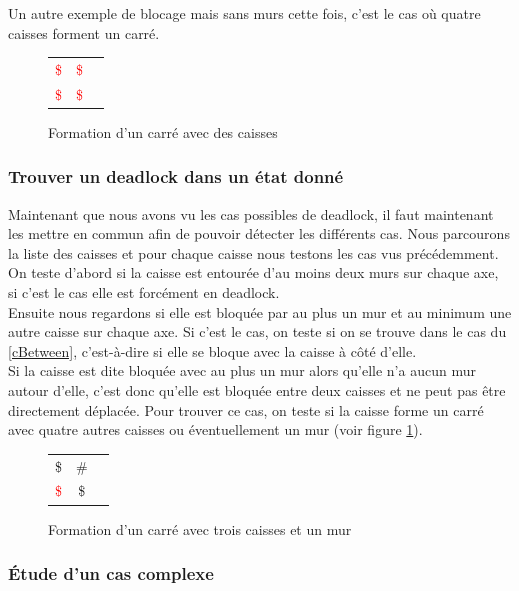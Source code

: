 \documentclass[a4paper,12pt]{article} %
\begin{document}
Un autre exemple de blocage mais sans murs cette fois, c'est le cas où quatre caisses forment un carré.

\begin{figure}[!h]
\centering
\begin{tabular}{ l c r }
\textcolor{red}{\$} & \textcolor{red}{\$} \\
\textcolor{red}{\$} & \textcolor{red}{\$} \\
\end{tabular}
\caption{Formation d'un carré avec des caisses}
\end{figure}

\subsubsection{Trouver un deadlock dans un état donné}

Maintenant que nous avons vu les cas possibles de deadlock, il faut maintenant les mettre en commun afin de pouvoir détecter les différents cas. Nous parcourons la liste des caisses et pour chaque caisse nous testons les cas vus précédemment. On teste d'abord si la caisse est entourée d'au moins deux murs sur chaque axe, si c'est le cas elle est forcément en deadlock.\\
Ensuite nous regardons si elle est bloquée par au plus un mur et au minimum une autre caisse sur chaque axe. Si c'est le cas, on teste si on se trouve dans le cas du \ref{cBetween}, c'est-à-dire si elle se bloque avec la caisse à côté d'elle.\\
Si la caisse est dite bloquée avec au plus un mur alors qu'elle n'a aucun mur autour d'elle, c'est donc qu'elle est bloquée entre deux caisses et ne peut pas être directement déplacée. Pour trouver ce cas, on teste si la caisse forme un carré avec quatre autres caisses ou éventuellement un mur (voir figure \ref{DLcarreMur}).

\begin{figure}[!h]
\centering
\begin{tabular}{ l c r }
\$                  & \# \\
\textcolor{red}{\$} & \$ \\
\end{tabular}
\caption{Formation d'un carré avec trois caisses et un mur}
\label{DLcarreMur}
\end{figure}

\subsubsection{Étude d'un cas complexe}
\end{document}
